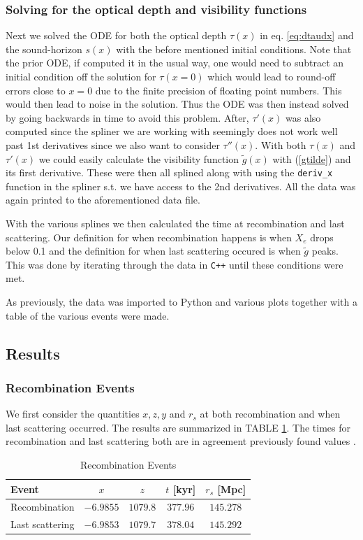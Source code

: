 \documentclass[%
reprint,
 amsmath,amssymb,
 aps,
]{revtex4-2}
\begin{document}
\subsubsection{Solving for the optical depth and visibility functions}
Next we solved the ODE for both the optical depth $\tau(x)$ in eq. \ref{eq:dtaudx} and the sound-horizon $s(x)$ with the before mentioned initial conditions. Note that the prior ODE, if computed it in the usual way, one would need to subtract an initial condition off the solution for $\tau(x=0)$ which would lead to round-off errors close to $x=0$ due to the finite precision of floating point numbers. This would then lead to noise in the solution. Thus the ODE was then instead solved by going backwards in time to avoid this problem. After, $\tau'(x)$ was also computed since the spliner we are working with seemingly does not work well past 1st derivatives since we also want to consider $\tau''(x)$. With both $\tau(x)$ and $\tau'(x)$ we could easily calculate the visibility function $\tilde g(x)$ with (\ref{gtilde}) and its first derivative. These were then all splined along with using the \texttt{deriv\_x} function in the spliner s.t. we have access to the 2nd derivatives. All the data was again printed to the aforementioned data file.

With the various splines we then calculated the time at recombination and last scattering. Our definition for when recombination happens is when $X_e$ drops below 0.1 and the definition for when last scattering occured is when $\tilde g$ peaks. This was done by iterating through the data in \texttt{C++} until these conditions were met.

As previously, the data was imported to Python and various plots together with a table of the various events were made.

\subsection{Results}
\subsubsection{Recombination Events}
We first consider the quantities $x,z,y$ and $r_s$ at both recombination and when last scattering occurred. The results are summarized in TABLE \ref{tab:recombination_events}. The times for recombination and last scattering both are in agreement previously found values \cite{Planck:2018vyg}.
\renewcommand{\arraystretch}{1.25}
\begin{table}[ht!]
	\caption{Recombination Events}
	\label{tab:recombination_events}
	\begin{tabular}{|l|c|c|c|c|}
		\hline
		Event                               & $x$       & $z$      & $t$ [kyr] & $r_s$ [Mpc] \\\hline
		Recombination                & $-6.9855$ & $1079.8$ & $377.96$  & $145.278$   \\\hline
		Last scattering                 & $-6.9853$ & $1079.7$ & $378.04$  & $145.292$   \\\hline
	\end{tabular}
\end{table}
\end{document}
